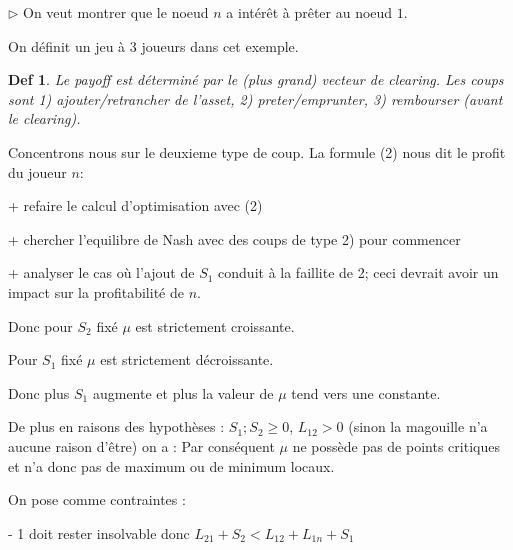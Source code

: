 \documentclass[11pt,oneside,twocolumn]{article}
\newtheorem{definition}{Def}
\begin{document}
$\triangleright$
On veut montrer que le noeud $n$ a intérêt à prêter au noeud $1$.

On définit un jeu à 3 joueurs dans cet exemple.
\begin{definition}\label{jeu3}
Le payoff est déterminé par le (plus grand) vecteur de clearing.
Les coups sont 1) ajouter/retrancher de l'asset,
2) preter/emprunter,
3) rembourser (avant le clearing).
\end{definition}

Concentrons nous sur le deuxieme type de coup.
La formule (2) nous dit le profit du joueur $n$:

+ refaire le calcul d'optimisation avec (2)

+ chercher l'equilibre de Nash avec des coups de type 2) pour commencer

+ analyser le cas où l'ajout de $S_1$ conduit à la faillite de 2; ceci devrait avoir un impact sur la profitabilité de $n$.

Donc pour $S_{2}$ fixé $\mu$ est strictement croissante.


Pour $S_{1}$ fixé $\mu$ est strictement décroissante.


Donc plus $S_{1}$ augmente et plus la valeur de $\mu$ tend vers une constante.


De plus en raisons des hypothèses : $S_{1}; S_{2} \geq 0$, $L_{12} > 0$ (sinon la magouille n'a aucune raison d'être) on a :
Par conséquent $\mu$ ne possède pas de points critiques et n'a donc pas de maximum ou de minimum locaux.


On pose comme contraintes :

- 1 doit rester insolvable donc $L_{21} + S_{2} < L_{12} + L_{1n} + S_{1}$
\end{document}
